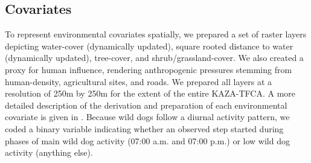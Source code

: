 \documentclass[abstract=on,10pt,a4paper,bibliography=totocnumbered]{article}
\begin{document}
\subsection{Covariates}
To represent environmental covariates spatially, we prepared a set of raster
layers depicting water-cover (dynamically updated), square rooted distance to
water (dynamically updated), tree-cover, and shrub/grassland-cover. We also
created a proxy for human influence, rendering anthropogenic pressures stemming
from human-density, agricultural sites, and roads. We prepared all layers at a
resolution of 250m by 250m for the extent of the entire KAZA-TFCA. A more
detailed description of the derivation and preparation of each environmental
covariate is given in \cite{Hofmann.2020}. Because wild dogs follow a diurnal
activity pattern, we coded a binary variable indicating whether an observed step
started during phases of main wild dog activity (07:00 a.m. and 07:00 p.m.) or
low wild dog activity (anything else).
\end{document}
